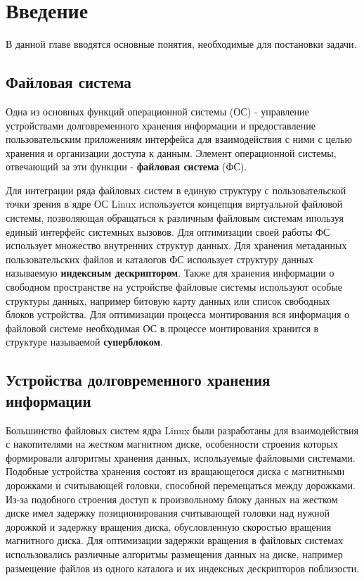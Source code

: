 \section{Введение}
\label{sec:Chapter0} 

В данной главе вводятся основные понятия, необходимые для постановки задачи.

\subsection{Файловая система}

Одна из основных функций операционной системы (ОС) - управление устройствами долговременного хранения информации и предоставление пользовательским приложениям интерфейса для взаимодействия с ними с целью хранения и организации доступа к данным. Элемент операционной системы, отвечающий за эти функции - \textbf{файловая система} (ФС). 

Для интеграции ряда файловых систем в единую структуру с пользовательской точки зрения в ядре ОС Linux используется концепция виртуальной файловой системы, позволяющая обращаться к различным файловым системам ипользуя единый интерфейс системных вызовов. Для оптимизации своей работы ФС использует множество внутренних структур данных. Для хранения метаданных пользовательских файлов и каталогов ФС использует структуру данных называемую \textbf{индексным дескриптором}. Также для хранения информации о свободном пространстве на устройстве файловые системы используют особые структуры данных, например битовую карту данных или список свободных блоков устройства. Для оптимизации процесса монтирования вся информация о файловой системе необходимая ОС в процессе монтирования хранится в структуре называемой \textbf{суперблоком}.

\subsection{Устройства долговременного хранения информации}

Большинство файловых систем ядра Linux были разработаны для взаимодействия с накопителями на жестком магнитном диске, особенности строения которых формировали алгоритмы хранения данных, используемые файловыми системами. Подобные устройства хранения состоят из вращающегося диска с магнитными дорожками и считывающей головки, способной перемещаться между дорожками. Из-за подобного строения доступ к произвольному блоку данных на жестком диске имел задержку позиционирования считывающей головки над нужной дорожкой и задержку вращения диска, обусловленную скоростью вращения магнитного диска. Для оптимизации задержки вращения в файловых системах использовались различные алгоритмы размещения данных на диске, например размещение файлов из одного каталога и их индексных дескрипторов поблизости.

